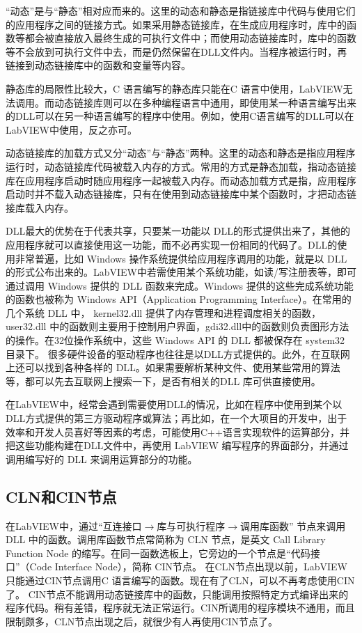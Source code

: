 “动态”是与“静态”相对应而来的。这里的动态和静态是指链接库中代码与使用它们的应用程序之间的链接方式。如果采用静态链接库，在生成应用程序时，库中的函数等都会被直接放入最终生成的可执行文件中；而使用动态链接库时，库中的函数等不会放到可执行文件中去，而是仍然保留在DLL文件内。当程序被运行时，再链接到动态链接库中的函数和变量等内容。

静态库的局限性比较大，C 语言编写的静态库只能在C 语言中使用，LabVIEW无法调用。而动态链接库则可以在多种编程语言中通用，即使用某一种语言编写出来的DLL可以在另一种语言编写的程序中使用。例如，使用C语言编写的DLL可以在LabVIEW中使用，反之亦可。

动态链接库的加载方式又分“动态”与“静态”两种。这里的动态和静态是指应用程序运行时，动态链接库代码被载入内存的方式。常用的方式是静态加载，指动态链接库在应用程序启动时随应用程序一起被载入内存。而动态加载方式是指，应用程序启动时并不载入动态链接库，只有在使用到动态链接库中某个函数时，才把动态链接库载入内存。

DLL最大的优势在于代表共享，只要某一功能以 DLL的形式提供出来了，其他的应用程序就可以直接使用这一功能，而不必再实现一份相同的代码了。DLL的使用非常普遍，比如 Windows 操作系统提供给应用程序调用的功能，就是以 DLL 的形式公布出来的。LabVIEW中若需使用某个系统功能，如读/写注册表等，即可通过调用 Windows 提供的 DLL 函数来完成。Windows 提供的这些完成系统功能的函数也被称为 Windows API（Application Programming Interface）。在常用的几个系统 DLL 中， kernel32.dll 提供了内存管理和进程调度相关的函数，user32.dll 中的函数则主要用于控制用户界面，gdi32.dll中的函数则负责图形方法的操作。在32位操作系统中，这些 Windows API 的 DLL 都被保存在 system32 目录下。
%
很多硬件设备的驱动程序也往往是以DLL方式提供的。此外，在互联网上还可以找到各种各样的 DLL。如果需要解析某种文件、使用某些常用的算法等，都可以先去互联网上搜索一下，是否有相关的DLL 库可供直接使用。

在LabVIEW中，经常会遇到需要使用DLL的情况，比如在程序中使用到某个以DLL方式提供的第三方驱动程序或算法；再比如，在一个大项目的开发中，出于效率和开发人员喜好等因素的考虑，可能使用C++语言实现软件的运算部分，并把这些功能构建在DLL文件中，再使用 LabVIEW 编写程序的界面部分，并通过调用编写好的 DLL 来调用运算部分的功能。


\subsection{CLN和CIN节点}
在LabVIEW中，通过“互连接口$\rightarrow$库与可执行程序$\rightarrow$调用库函数” 节点来调用 DLL 中的函数。调用库函数节点常简称为 CLN 节点，是英文 Call Library Function Node 的缩写。在同一函数选板上，它旁边的一个节点是“代码接口”（Code Interface Node），简称 CIN节点。
在CLN节点出现以前，LabVIEW只能通过CIN节点调用C 语言编写的函数。现在有了CLN，可以不再考虑使用CIN了。
CIN节点不能调用动态链接库中的函数，只能调用按照特定方式编译出来的程序代码。稍有差错，程序就无法正常运行。CIN所调用的程序模块不通用，而且限制颇多，CLN节点出现之后，就很少有人再使用CIN节点了。



